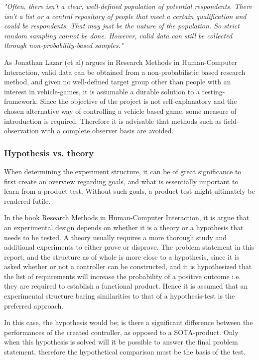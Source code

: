 \textit{"Often, there isn’t a clear, well-defined population of potential respondents. There isn’t a list or a central repository of people that meet a certain qualification and could be respondents. That may just be the nature of the population. So strict random sampling cannot be done. However, valid data can still be collected through non-probability-based samples."} \parencite{Lazar2010}
\bigskip

As Jonathan Lazar (et al) argues in Research Methods in Human-Computer Interaction, valid data can be obtained from a non-probabilistic based research method, and given no well-defined target group other than people with an interest in vehicle-games, it is assumable a durable solution to a testing-framework.
Since the objective of the project is not self-explanatory and the chosen alternative way of controlling a vehicle based game, some measure of introduction is required. Therefore it is advisable that methods such as field-observation with a complete observer basis are avoided. 	


\subsubsection{Hypothesis vs. theory} \label{sec:hypotheory}
When determining the experiment structure, it can be of great significance to first create an overview regarding goals, and what is essentially important to learn from a product-test. Without such goals, a product test might ultimately be rendered futile.
\bigskip

In the book Research Methods in Human-Computer Interaction, it is argue that an experimental design depends on whether it is a theory or a hypothesis that needs to be tested. A theory usually requires a more thorough study and additional experiments to either prove or disprove. The problem statement in this report, and the structure as of whole is more close to a hypothesis, since it is asked whether or not a controller can be constructed, and it is hypothesized that the list of requirements  will increase the probability of a positive outcome i.e. they are required to establish a functional product. Hence it is assumed that an experimental structure baring similarities to that of a hypothesis-test is the preferred approach.

In this case, the hypothesis would be; is there a significant difference between the performances of the created controller, as opposed to a SOTA-product. Only when this hypothesis is solved will it be possible to answer the final problem statement, therefore the hypothetical comparison must be the basis of the test.
\bigskip

